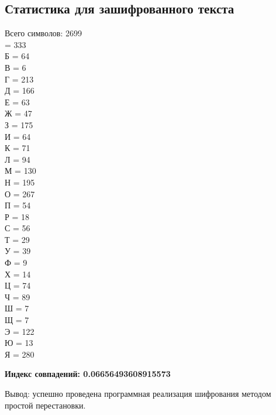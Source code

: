 \documentclass[a4paper, 14pt]{extarticle}
\begin{document}
\subsection{Статистика для зашифрованного текста}

Всего символов: 2699\\

 = 333
\\Б = 64
\\В = 6
\\Г = 213
\\Д = 166
\\Е = 63
\\Ж = 47
\\З = 175
\\И = 64
\\К = 71
\\Л = 94
\\М = 130
\\Н = 195
\\О = 267
\\П = 54
\\Р = 18
\\С = 56
\\Т = 29
\\У = 39
\\Ф = 9
\\Х = 14
\\Ц = 74
\\Ч = 89
\\Ш = 7
\\Щ = 7
\\Э = 122
\\Ю = 13
\\Я = 280

\textbf{Индекс совпадений: 0.06656493608915573}


Вывод:  успешно проведена программная реализация шифрования методом простой перестановки.
\end{document}
